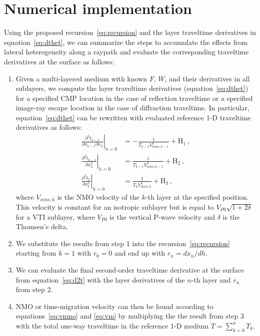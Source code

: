 \section{Numerical implementation}
Using the proposed recursion~\ref{eq:recursion} and the layer traveltime derivatives in equation~\ref{eq:dthet}, we can summarize the steps to accumulate the effects from lateral heterogeneity along a raypath and evaluate the corresponding traveltime derivatives at the surface as follows:
\begin{enumerate}
    \item Given a multi-layered medium with known $F$, $W$, and their derivatives in all sublayers, we compute the layer traveltime derivatives (equation~\ref{eq:dthet}) for a specified CMP location in the case of reflection traveltime or a specified image-ray escape location in the case of diffraction traveltime. In particular, equation~\ref{eq:dthet} can be rewritten with evaluated reference 1-D traveltime derivatives as follows:
\begin{align}
\label{eq:dtheteval}
\left.\frac{\partial^2 t_{k-1}}{\partial x_{k-1} \partial x_{k}}\right\rvert_{h=0} & = -\frac{1}{T_{k-1} V^2_{nmo,k-1}} + \mbox{H}_1 ~,\\
\nonumber
\left.\frac{\partial^2 t_{k-1}}{\partial x_{k}^2}\right\rvert_{h=0} & = \frac{1}{T_{k-1} V^2_{nmo,k-1}} + \mbox{H}_2  ~,\\
\nonumber
\left.\frac{\partial^2 t_{k}}{\partial x^2_{k}}\right\rvert_{h=0} & = \frac{1}{T_{k} V^2_{nmo,k}} +  \mbox{H}_3  ~,
\end{align}
    where $V_{nmo,k}$ is the NMO velocity of the $k$-th layer at the specified position. This velocity is constant for an isotropic sublayer but is equal to $V_{P0}\sqrt{1+2\delta}$ for a VTI sublayer, where $V_{P0}$ is the vertical P-wave velocity and $\delta$ is the Thomsen's delta.
    \item We substitute the results from step 1 into the recursion~\ref{eq:recursion} starting from $k=1$ with $r_0 = 0$ and end up with $r_n = dx_n/dh$.
    \item We can evaluate the final second-order traveltime derivative at the surface from equation~\ref{eq:d2t} with the layer derivatives of the $n$-th layer and $r_n$ from step 2.
    \item NMO or time-migration velocity can then be found according to equations~\ref{eq:vnmo} and \ref{eq:vm} by multiplying the the result from step 3 with the total one-way traveltime in the reference 1-D medium $T = \sum^n_{k=0} T_k$. 
\end{enumerate}

